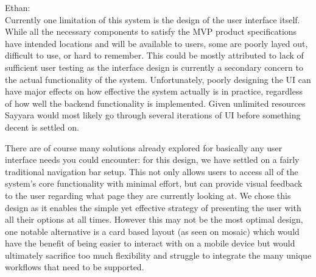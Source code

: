 \documentclass[12pt, titlepage]{article}
\begin{document}
Ethan:\\
Currently one limitation of this system is the design of the user interface itself. While all the necessary components to satisfy the MVP product specifications have intended locations and will be available to users, some are poorly layed out, difficult to use, or hard to remember. This could be mostly attributed to lack of sufficient user testing as the interface design is currently a secondary concern to the actual functionality of the system. Unfortunately, poorly designing the UI can have major effects on how effective the system actually is in practice, regardless of how well the backend functionality is implemented. Given unlimited resources Sayyara would most likely go through several iterations of UI before something decent is settled on.

There are of course many solutions already explored for basically any user interface needs you could encounter: for this design, we have settled on a fairly traditional navigation bar setup. This not only allows users to access all of the system's core functionality with minimal effort, but can provide visual feedback to the user regarding what page they are currently looking at. We chose this design as it enables the simple yet effective strategy of presenting the user with all their options at all times. However this may not be the most optimal design, one notable alternative is a card based layout (as seen on mosaic) which would have the benefit of being easier to interact with on a mobile device but would ultimately sacrifice too much flexibility and struggle to integrate the many unique workflows that need to be supported.
 
\end{document}
